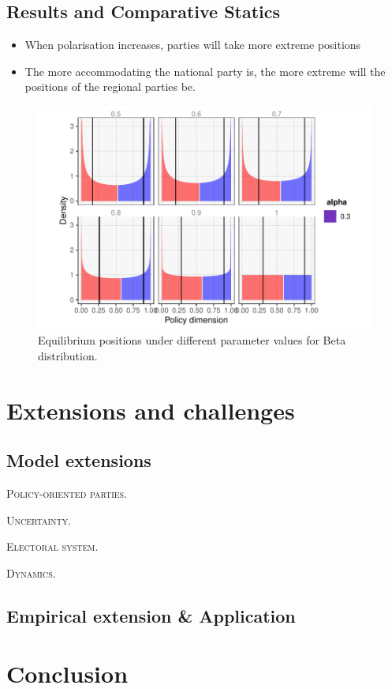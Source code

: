 \documentclass[11pt]{article}
\begin{document}
\subsection{Results and Comparative Statics}

\begin{itemize}
    \item When polarisation increases, parties will take more extreme positions
    \item The more accommodating the national party is, the more extreme will the positions of the regional parties be.
\end{itemize}

\begin{figure}
    \centering
    \includegraphics{../../output/polarisation.pdf}
    \caption{Equilibrium positions under different parameter values for Beta distribution.}
    \label{fig:betadist}
\end{figure}

\section{Extensions and challenges}

\subsection{Model extensions}

\textsc{Policy-oriented parties.}

\textsc{Uncertainty.}

\textsc{Electoral system.}

\textsc{Dynamics.}

\subsection{Empirical extension \& Application}



\section{Conclusion}


\renewcommand*{\mkbibnamefamily}[1]{\textsc{\textbf{#1}}}
\renewcommand*{\mkbibnamegiven}[1]{\textsc{#1}}
\printbibliography
\end{document}
